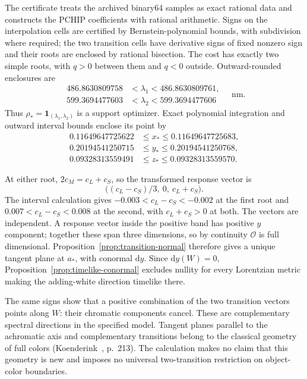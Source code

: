 \documentclass[9pt,twocolumn,twoside]{opticajnl}
\theoremstyle{plain}
\newcommand{\dd}{\mathrm{d}}
\begin{document}
The certificate treats the archived binary64 samples as exact rational data and constructs the PCHIP coefficients with rational arithmetic. Signs on the interpolation cells are certified by Bernstein-polynomial bounds, with subdivision where required; the two transition cells have derivative signs of fixed nonzero sign and their roots are enclosed by rational bisection. The cost has exactly two simple roots, with $q>0$ between them and $q<0$ outside. Outward-rounded enclosures are
\begin{equation}
 \begin{aligned}
 486.8630809758&<\lambda_1<486.8630809761,\\
 599.3694477603&<\lambda_2<599.3694477606
 \end{aligned}
 \quad\text{nm}.
 \label{eq:object-roots}
\end{equation}
Thus $\rho_*=\mathbf1_{(\lambda_1,\lambda_2)}$ is a support optimizer. Exact polynomial integration and outward interval bounds enclose its point by
\begin{equation}
 \begin{aligned}
 0.11649647725622&\leq x_*\leq0.11649647725683,\\
 0.20194541250715&\leq y_*\leq0.20194541250768,\\
 0.09328313559491&\leq z_*\leq0.09328313559570.
 \end{aligned}
 \label{eq:object-point}
\end{equation}

At either root, $2c_M=c_L+c_S$, so the transformed response vector is
\begin{equation}
 \bigl((c_L-c_S)/3,\ 0,\ c_L+c_S\bigr).
 \label{eq:transition-vector}
\end{equation}
The interval calculation gives $-0.003<c_L-c_S<-0.002$ at the first root and $0.007<c_L-c_S<0.008$ at the second, with $c_L+c_S>0$ at both. The vectors are independent. A response vector inside the positive band has positive $y$ component; together these span three dimensions, so by continuity $\mathcal O$ is full dimensional. Proposition~\ref{prop:transition-normal} therefore gives a unique tangent plane at $a_*$, with conormal $\dd y$. Since $\dd y(W)=0$, Proposition~\ref{prop:timelike-conormal} excludes nullity for every Lorentzian metric making the adding-white direction timelike there.

The same signs show that a positive combination of the two transition vectors points along $W$: their chromatic components cancel. These are complementary spectral directions in the specified model. Tangent planes parallel to the achromatic axis and complementary transitions belong to the classical geometry of full colors (Koenderink~\cite{Koenderink2010}, p.~213). The calculation makes no claim that this geometry is new and imposes no universal two-transition restriction on object-color boundaries.
\end{document}

